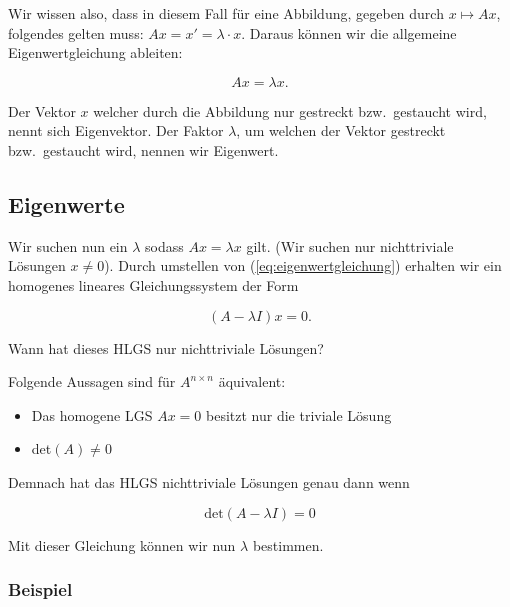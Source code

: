 Wir wissen also, dass in diesem Fall für eine Abbildung, gegeben durch \( x \mapsto Ax \), folgendes gelten muss: \( Ax = x' = \lambda \cdot x \). Daraus können wir die allgemeine Eigenwertgleichung ableiten:

\begin{equation}
    Ax = \lambda x.
    \label{eq:eigenwertgleichung}
\end{equation}

Der Vektor \(x \) welcher durch die Abbildung nur gestreckt bzw.\ gestaucht wird, nennt sich Eigenvektor. Der Faktor \( \lambda \), um welchen der Vektor gestreckt bzw.\ gestaucht wird, nennen wir Eigenwert.

\subsection{Eigenwerte}

Wir suchen nun ein \( \lambda \) sodass \( Ax = \lambda x \) gilt. (Wir suchen nur nichttriviale Lösungen \(x \neq 0\)). Durch umstellen von (\ref{eq:eigenwertgleichung})  erhalten wir ein homogenes lineares Gleichungssystem der Form

\begin{equation}
    (A - \lambda I) x = 0.
    \label{eq:eigenwertgleichung_homogen}
\end{equation}

Wann hat dieses HLGS nur nichttriviale Lösungen? 

\begin{tcolorbox}[colback=white, colframe=blue!50, title=Erinnerung aus der Linearen Algebra I]
    Folgende Aussagen sind für \( A^{n \times n} \) äquivalent:
    \begin{itemize}
        \item Das homogene LGS \( Ax = 0 \) besitzt nur die triviale Lösung 
        \item det\( (A) \neq 0 \)
    \end{itemize}
\end{tcolorbox}

Demnach hat das HLGS nichttriviale Lösungen genau dann wenn 

\begin{equation*}
    \text{det}(A - \lambda I) = 0
\end{equation*}

Mit dieser Gleichung können wir nun \( \lambda \) bestimmen.

\subsubsection*{Beispiel}

